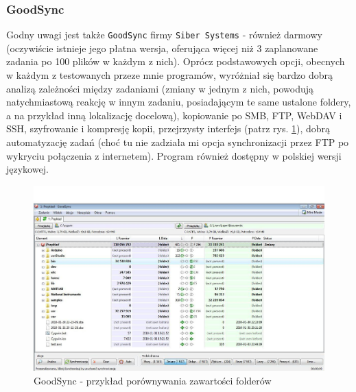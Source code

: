 \subsubsection{GoodSync}
Godny uwagi jest także \verb|GoodSync| firmy \verb|Siber Systems| \cite{2} - również darmowy (oczywiście istnieje jego płatna wersja, oferująca więcej niż 3 zaplanowane zadania po 100 plików w każdym z nich). Oprócz podstawowych opcji, obecnych w każdym z testowanych przeze mnie programów, wyróżniał się bardzo dobrą analizą zależności między zadaniami (zmiany w jednym z nich, powodują natychmiastową reakcję w innym zadaniu, posiadającym te same ustalone foldery, a na przykład inną lokalizację docelową), kopiowanie po SMB, FTP, WebDAV i SSH, szyfrowanie i kompresję kopii, przejrzysty interfejs (patrz rys. \ref{goodsync}), dobrą automatyzację zadań (choć tu nie zadziała mi opcja synchronizacji przez FTP po wykryciu połączenia z internetem). Program również dostępny w polskiej wersji językowej.
\begin{figure}[h!]
	\centering
	\includegraphics[width=1\textwidth]{img/s2.jpeg}
	\caption{GoodSync - przykład porównywania zawartości folderów}
	\label{goodsync}
\end{figure}

